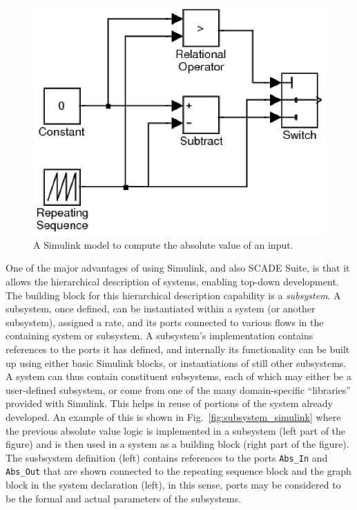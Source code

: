 \begin{figure}
\centering
\includegraphics[scale=0.5]{figs/abs_simulink}
\caption{A Simulink model to compute the absolute value of an input.}
\label{fig:abs_simulink}
\end{figure}

One of the major advantages of using Simulink, and also SCADE Suite,
is that it allows the hierarchical description of systems, enabling
top-down development. The building block for this hierarchical
description capability is a \emph{subsystem}. A subsystem, once
defined, can be instantiated within a system (or another subsystem),
assigned a rate, and its ports connected to various flows in the
containing system or subsystem. A subsystem's implementation contains
references to the ports it has defined, and internally its
functionality can be built up using either basic Simulink blocks, or
instantiations of still other subsystems. A system can thus contain
constituent subsystems, each of which may either be a user-defined
subsystem, or come from one of the many domain-specific ``libraries''
provided with Simulink. This helps in reuse of portions of the system
already developed. An example of this is shown in
Fig.~\ref{fig:subsystem_simulink} where the previous absolute value
logic is implemented in a subsystem (left part of the figure) and is
then used in a system as a building block (right part of the
figure). The susbsystem definition (left) contains references to the
ports \texttt{Abs\_In} and \texttt{Abs\_Out} that are shown connected
to the repeating sequence block and the graph block in the system
declaration (left), in this sense, ports may be considered to be the
formal and actual parameters of the subsystems.

